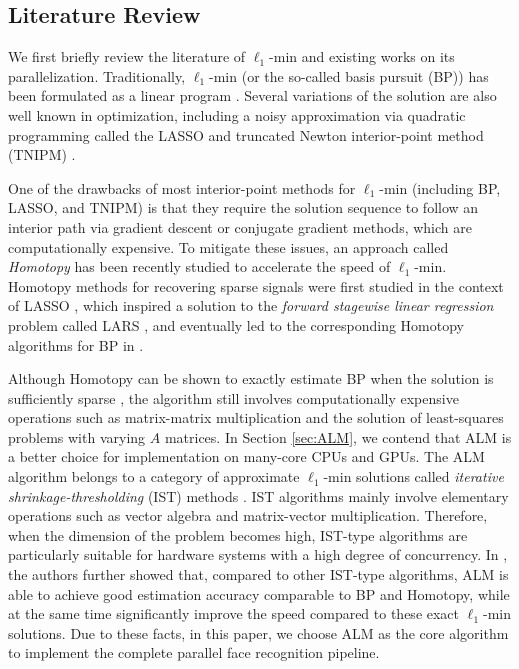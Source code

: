 \documentclass[10pt,twocolumn,letterpaper]{article}
\begin{document}
\subsection{Literature Review} 
We first briefly review the literature of $\ell_1$-min and existing
works on its parallelization.  Traditionally, $\ell_1$-min (or the so-called
basis pursuit (BP)) has been formulated as a linear program
\cite{ChenS2001-SIAM}. Several variations of the solution are also well known
in optimization, including a noisy approximation via quadratic programming
called the LASSO \cite{TibshiraniR1996} and truncated Newton interior-point
method (TNIPM) \cite{KimS2007}.

One of the drawbacks of most interior-point methods for $\ell_1$-min (including
BP, LASSO, and TNIPM) is that they require the solution sequence to follow an
interior path via gradient descent or conjugate gradient methods, which are computationally expensive.
To mitigate these issues, an approach called \emph{Homotopy} has been recently studied to accelerate the
speed of $\ell_1$-min. Homotopy methods for recovering sparse signals were
first studied in the context of LASSO \cite{OsborneM2000}, which inspired a
solution to the \emph{forward stagewise linear regression} problem called LARS
\cite{EfronB2004}, and eventually led to the corresponding Homotopy algorithms
for BP in \cite{MalioutovD2005,DonohoD2006}.

Although Homotopy can be shown to exactly estimate BP when the solution is
sufficiently sparse \cite{DonohoD2006}, the algorithm still involves 
computationally expensive operations such as matrix-matrix multiplication and 
the solution of least-squares problems with varying $A$ matrices. 
In Section \ref{sec:ALM}, we contend
that ALM is a better choice for implementation on many-core CPUs and GPUs. The ALM algorithm belongs to a
category of approximate $\ell_1$-min solutions called \emph{iterative
shrinkage-thresholding} (IST) methods \cite{WrightS2008,BeckA2009}.
IST algorithms mainly involve elementary operations such as vector 
algebra and matrix-vector multiplication. Therefore,
when the dimension of the problem becomes high, IST-type algorithms are
particularly suitable for hardware systems with a high degree of concurrency. In
\cite{YangA2010-ICIP}, the authors further showed that, compared to other
IST-type algorithms, ALM is able to achieve good estimation accuracy comparable
to BP and Homotopy, while at the same time significantly improve the speed
compared to these exact $\ell_1$-min solutions. Due to these facts, in this
paper, we choose ALM as the core algorithm to implement the complete parallel
face recognition pipeline.
\end{document}
